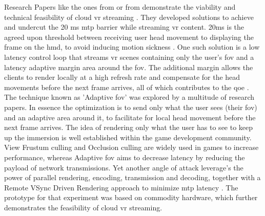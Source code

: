 Research Papers like the ones from \cite{cutcord} or from \cite{mvr} demonstrate the viability and technical feasibility of cloud \acrshort{vr} streaming . They developed solutions to achieve and undercut the 20 \acrfull{ms} \acrfull{mtp} barrier while streaming \acrshort{vr} content. 20\acrshort{ms} is the agreed upon threshold between receiving user head movement to displaying the frame on the \acrfull{hmd}, to avoid inducing motion sickness \parencite{valvevrlatency}. One such solution is a low latency control loop that streams \acrshort{vr} scenes containing only the user’s \acrfull{fov} and a latency adaptive margin area around the \acrshort{fov}. The additional margin allows the clients to render locally at a high refresh rate and compensate for the head movements before the next frame arrives, all of which contributes to the \acrshort{qoe} \parencite{mvr}. The technique known as 'Adaptive \acrfull{fov}' was explored by a multitude of research papers. In essence the optimization is to send only what the user sees (their \acrshort{fov}) and an adaptive area around it, to facilitate for local head movement before the next frame arrives. The idea of rendering only what the user has to see to keep up the immersion is well established within the game development community. View Frustum culling and Occlusion culling \parencite{cullingdefinition} are widely used in games to increase performance, whereas Adaptive \acrshort{fov} aims to decrease latency by reducing the payload of network transmissions. Yet another angle of attack leverage's the power of parallel rendering, encoding, transmission and decoding, together with a Remote VSync Driven Rendering approach to minimize \acrshort{mtp} latency \parencite{cutcord}. The prototype for that experiment was based on commodity hardware, which further demonstrates the feasibility of cloud \acrshort{vr} streaming. 

